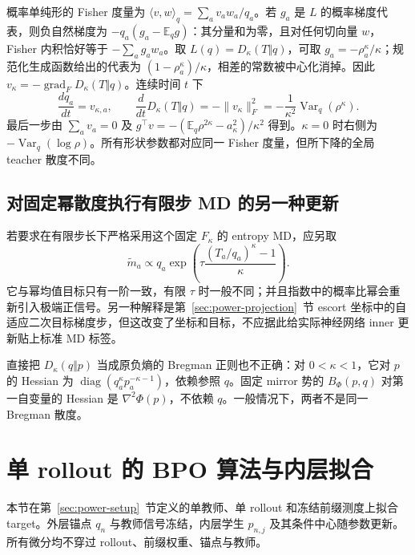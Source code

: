 \documentclass[lang=cn,scheme=chinese,openany]{../book/elegantbook}
\newcommand{\E}{\mathbb E}
\newcommand{\Var}{\operatorname{Var}}
\begin{document}
概率单纯形的 Fisher 度量为 $\langle v,w\rangle_q=\sum_av_aw_a/q_a$。若 $g_a$ 是 $L$ 的概率梯度代表，则负自然梯度为 $-q_a(g_a-\E_qg)$：其分量和为零，且对任何切向量 $w$，Fisher 内积恰好等于 $-\sum_ag_aw_a$。取 $L(q)=D_\kappa(T\Vert q)$，可取 $g_a=-\rho_a^\kappa/\kappa$；规范化生成函数给出的代表为 $(1-\rho_a^\kappa)/\kappa$，相差的常数被中心化消掉。因此 $v_\kappa=-\operatorname{grad}_{\!F}D_\kappa(T\Vert q)$。连续时间 $t$ 下
\begin{equation}
 \frac{dq_a}{dt}=v_{\kappa,a},\qquad
 \frac{d}{dt}D_\kappa(T\Vert q)
 =-\|v_\kappa\|_F^2
 =-\frac1{\kappa^2}\Var_q(\rho^\kappa).
 \label{eq:proximal-flow-lyapunov}
\end{equation}
最后一步由 $\sum_av_a=0$ 及 $g^\top v=-(\E_q\rho^{2\kappa}-a_\kappa^2)/\kappa^2$ 得到。$\kappa=0$ 时右侧为 $-\Var_q(\log\rho)$。所有形状参数都对应同一 Fisher 度量，但所下降的全局 teacher 散度不同。
\subsection{对固定幂散度执行有限步 MD 的另一种更新}

若要求在有限步长下严格采用这个固定 $F_\kappa$ 的 entropy MD，应另取
\begin{equation}
 \widetilde m_a\propto q_a
   \exp\left(\tau\frac{(T_a/q_a)^\kappa-1}{\kappa}\right).
 \label{eq:power-bpo-true-md-variant}
\end{equation}
它与幂均值目标只有一阶一致，有限 $\tau$ 时一般不同；并且指数中的概率比幂会重新引入极端正信号。另一种解释是第~\ref{sec:power-projection}~节 escort 坐标中的自适应二次目标梯度步，但这改变了坐标和目标，不应据此给实际神经网络 inner 更新贴上标准 MD 标签。

直接把 $D_\kappa(q\Vert p)$ 当成原负熵的 Bregman 正则也不正确：对 $0<\kappa<1$，它对 $p$ 的 Hessian 为 $\operatorname{diag}(q_a^\kappa p_a^{-\kappa-1})$，依赖参照 $q$。固定 mirror 势的 $B_\Phi(p,q)$ 对第一自变量的 Hessian 是 $\nabla^2\Phi(p)$，不依赖 $q$。一般情况下，两者不是同一 Bregman 散度。



\section{单 rollout 的 BPO 算法与内层拟合}

\label{sec:power-bpo-algorithm}

本节在第~\ref{sec:power-setup}~节定义的单教师、单 rollout 和冻结前缀测度上拟合 target。外层锚点 $q_n$ 与教师信号冻结，内层学生 $p_{n,j}$ 及其条件中心随参数更新。所有微分均不穿过 rollout、前缀权重、锚点与教师。
\end{document}
